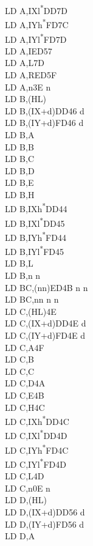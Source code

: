 \documentclass[oneside,a4paper]{book}
\begin{document}
\begin{multicols}{3}
{\begin{tabbing}
LD A,IXl\textsuperscript{*}\>DD7D\\
LD A,IYh\textsuperscript{*}\>FD7C\\
LD A,IYl\textsuperscript{*}\>FD7D\\
LD A,I\>ED57\\
LD A,L\>7D\\
LD A,R\>ED5F\\
LD A,n\>3E n\\
LD B,(HL)\\
LD B,(IX+d)\>DD46 d\\
LD B,(IY+d)\>FD46 d\\
LD B,A\\
LD B,B\\
LD B,C\\
LD B,D\\
LD B,E\\
LD B,H\\
LD B,IXh\textsuperscript{*}\>DD44\\
LD B,IXl\textsuperscript{*}\>DD45\\
LD B,IYh\textsuperscript{*}\>FD44\\
LD B,IYl\textsuperscript{*}\>FD45\\
LD B,L\\
LD B,n n\\
LD BC,(nn)\>ED4B n n\\
LD BC,nn n n\\
LD C,(HL)\>4E\\
LD C,(IX+d)\>DD4E d\\
LD C,(IY+d)\>FD4E d\\
LD C,A\>4F\\
LD C,B\\
LD C,C\\
LD C,D\>4A\\
LD C,E\>4B\\
LD C,H\>4C\\
LD C,IXh\textsuperscript{*}\>DD4C\\
LD C,IXl\textsuperscript{*}\>DD4D\\
LD C,IYh\textsuperscript{*}\>FD4C\\
LD C,IYl\textsuperscript{*}\>FD4D\\
LD C,L\>4D\\
LD C,n\>0E n\\
LD D,(HL)\\
LD D,(IX+d)\>DD56 d\\
LD D,(IY+d)\>FD56 d\\
LD D,A\\

\end{tabbing}}
\end{multicols}
\end{document}
